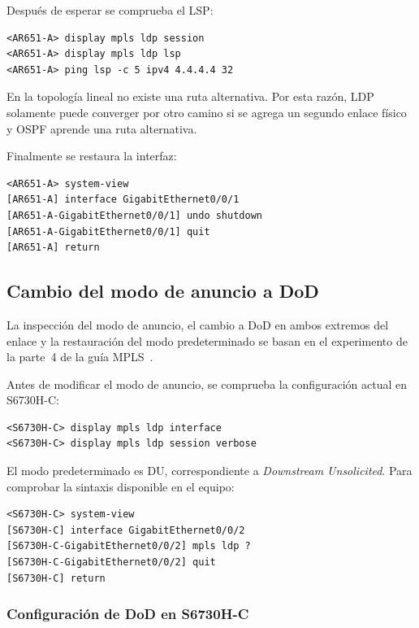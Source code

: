 Después de esperar se comprueba el LSP:

\begin{lstlisting}[style=terminal]
<AR651-A> display mpls ldp session
<AR651-A> display mpls ldp lsp
<AR651-A> ping lsp -c 5 ipv4 4.4.4.4 32
\end{lstlisting}

En la topología lineal no existe una ruta alternativa. Por esta razón, LDP
solamente puede converger por otro camino si se agrega un segundo enlace
físico y OSPF aprende una ruta alternativa.

Finalmente se restaura la interfaz:

\begin{lstlisting}[style=terminal]
<AR651-A> system-view
[AR651-A] interface GigabitEthernet0/0/1
[AR651-A-GigabitEthernet0/0/1] undo shutdown
[AR651-A-GigabitEthernet0/0/1] quit
[AR651-A] return
\end{lstlisting}

\subsection{Cambio del modo de anuncio a DoD}

La inspección del modo de anuncio, el cambio a DoD en ambos extremos del
enlace y la restauración del modo predeterminado se basan en el experimento
de la parte~4 de la guía MPLS~\cite[parte~4]{guia-mpls-ar651-s6730h}.

Antes de modificar el modo de anuncio, se comprueba la configuración actual
en S6730H-C:

\begin{lstlisting}[style=terminal]
<S6730H-C> display mpls ldp interface
<S6730H-C> display mpls ldp session verbose
\end{lstlisting}

El modo predeterminado es DU, correspondiente a \textit{Downstream
Unsolicited}. Para comprobar la sintaxis disponible en el equipo:

\begin{lstlisting}[style=terminal]
<S6730H-C> system-view
[S6730H-C] interface GigabitEthernet0/0/2
[S6730H-C-GigabitEthernet0/0/2] mpls ldp ?
[S6730H-C-GigabitEthernet0/0/2] quit
[S6730H-C] return
\end{lstlisting}

\subsubsection{Configuración de DoD en S6730H-C}

